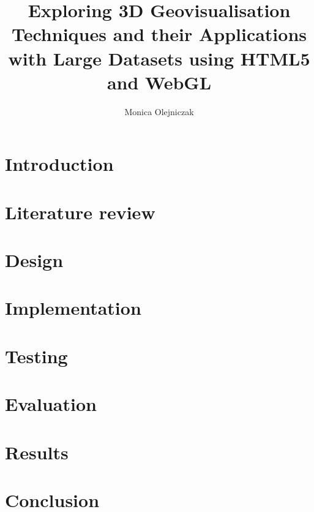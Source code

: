 \documentclass[
	paper=A4,
    titlepage=true,
	fontsize=11pt,
	parskip=half
]{scrreprt}
\title{Exploring 3D Geovisualisation Techniques and their Applications with Large Datasets using HTML5 and WebGL}
\author{Monica Olejniczak}
\begin{document}
	

	\setcounter{page}{1}
	
	\chapter{Introduction} {
	\label{ch:introduction}
		
	}

	\chapter{Literature review} {
	\label{ch:literature_review}
		
	}
	
	\chapter{Design} {
	\label{ch:design}
			
	}
	
	\chapter{Implementation} {
	\label{ch:implementation}
		
	}

	\chapter{Testing} {
	\label{ch:testing}
		
	}

	\chapter{Evaluation} {
	\label{ch:evaluation}
		
	}

	\chapter{Results} {
	\label{ch:results}
		
	}

	\chapter{Conclusion} {
	\label{ch:conclusion}
		
	}
	
	\renewcommand{\bibname}{References}
	\printbibliography[notcategory=exclude]
	
\end{document}
